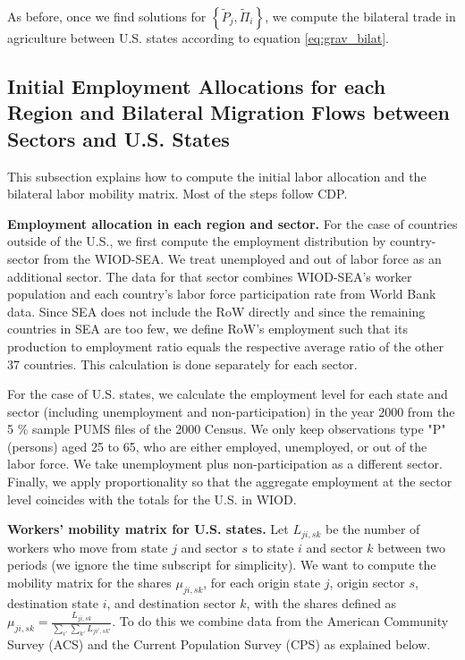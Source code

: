 \documentclass[12pt]{article}
\begin{document}
As before, once we find solutions for  $\left\{ \tilde{P}_{j}, \tilde{\Pi}_{i} \right\}$, we compute the  bilateral trade in agriculture between U.S. states according to equation \eqref{eq:grav_bilat}.

\subsection{Initial Employment Allocations for each Region and Bilateral Migration Flows between Sectors and U.S. States}\label{sec:appendix_data_migration}

This subsection explains how to compute the initial labor allocation and the bilateral labor mobility matrix. Most of the steps follow CDP. 

\textbf{Employment allocation in each region and sector.} For the case of countries outside of the U.S., we first compute the employment distribution by country-sector from the WIOD-SEA. We treat unemployed and out of labor force as an additional sector. The data for that sector combines WIOD-SEA's worker population and each country's labor force participation rate from World Bank data. Since SEA does not include the RoW directly and since the remaining countries in SEA are too few, we define RoW's employment such that its production to employment ratio equals the respective average ratio of the other 37 countries. This calculation is done separately for each sector. 

For the case of U.S. states, we calculate the employment level for each state and sector (including unemployment and non-participation) in the year 2000 from the 5 \% sample PUMS files of the 2000 Census. We only keep observations type "P" (persons) aged 25 to 65, who are either employed, unemployed, or out of the labor force. We take unemployment plus non-participation as a different sector. Finally, we apply proportionality so that the aggregate employment at the sector level coincides with the totals for the U.S. in WIOD. 

\textbf{Workers' mobility matrix for U.S. states.} Let \(L_{ji,sk}\) be the number of workers who move from state $j$
and sector $s$ to state $i$ and sector $k$ between two periods (we ignore the time subscript for simplicity). We want to compute the mobility matrix for the shares  \(\mu_{ji,sk}\), for each origin state \(j\), origin sector \(s\), destination state \(i\), and destination sector \(k\), with the shares defined as  \(\mu_{ji,sk}=\frac{L_{ji,sk}}{\sum_{i'}\sum_{k'}L_{ji',sk'}}\).
To do this we combine data from the American Community Survey (ACS) and the Current Population Survey (CPS) as explained below. 
\end{document}
